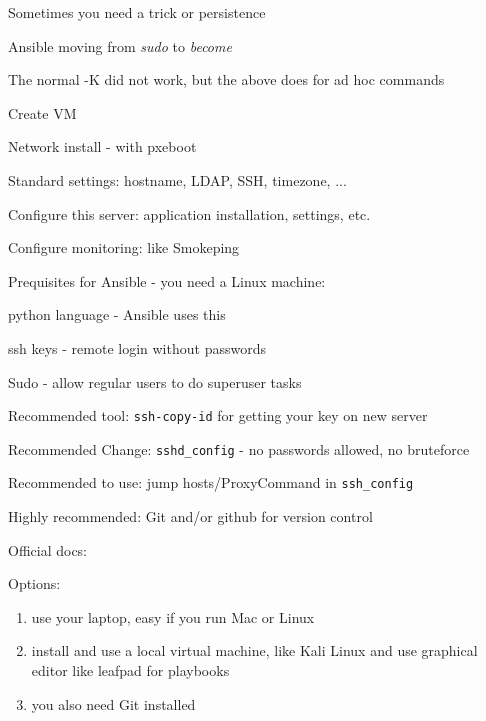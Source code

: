 \documentclass[Screen16to9,17pt]{foils}
\begin{document}
\begin{list2}
\item Sometimes you need a trick or persistence
\item Ansible moving from \emph{sudo} to \emph{become}
\item The normal -K did not work, but the above does for ad hoc commands
\end{list2}


\begin{list2}
\item Create VM
\item Network install - with pxeboot
\item Standard settings: hostname, LDAP, SSH, timezone,  ...
\item Configure this server: application installation, settings, etc.
\item Configure monitoring: like Smokeping
\end{list2}



Prequisites for Ansible - you need a Linux machine:
\begin{list2}
\item python language - Ansible uses this
\item ssh keys - remote login without passwords
\item Sudo - allow regular users to do superuser tasks
\item Recommended tool: \verb+ssh-copy-id+ for getting your key on new server
\item Recommended Change: \verb+sshd_config+ - no passwords allowed, no bruteforce
\item Recommended to use: jump hosts/ProxyCommand in \verb+ssh_config+
\item Highly recommended: Git and/or github for version control
\end{list2}

Official docs:\\

Options:
\begin{enumerate}
\item use your laptop, easy if you run Mac or Linux
\item install and use a local virtual machine, like Kali Linux and use graphical editor like leafpad for playbooks
\item you also need Git installed
\end{enumerate}
\end{document}
